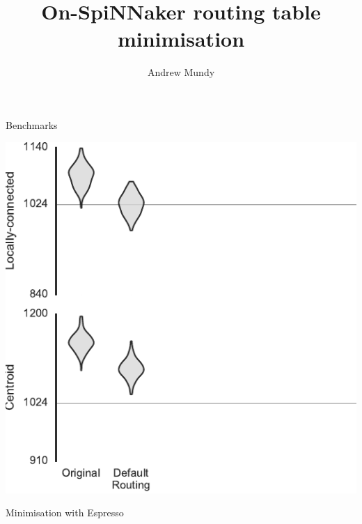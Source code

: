 \documentclass[t]{beamer}
\title{On-SpiNNaker routing table minimisation}
\author{Andrew Mundy}
\begin{document}
\maketitle

\begin{frame}{Benchmarks}
  
\end{frame}

\begin{frame}[plain]{}
  \begin{center}
    \includegraphics[page=1]{experiments/presentation_plots}
  \end{center}
\end{frame}

\begin{frame}{Minimisation with Espresso}  %
  
\end{frame}
\end{document}
